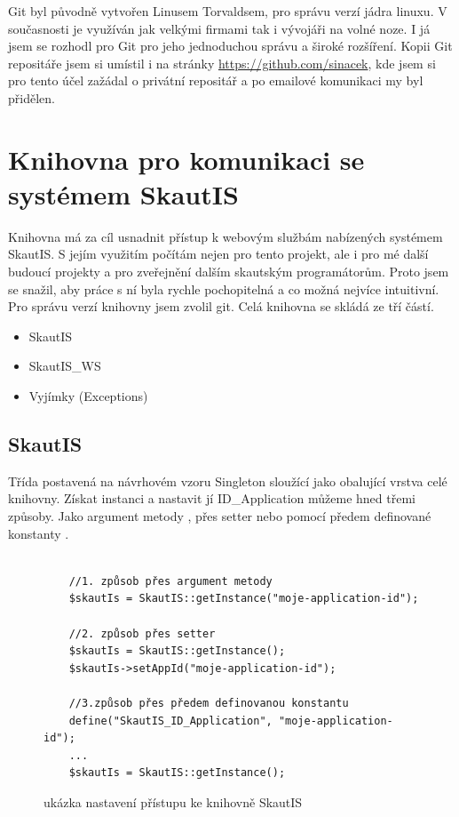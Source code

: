 \documentclass[thesis=B,czech]{FITthesis}[2011/06/14]
\begin{document}
Git byl původně vytvořen Linusem Torvaldsem, pro správu verzí jádra linuxu. V současnosti je využíván jak velkými firmami tak i vývojáři na volné noze. I já jsem se rozhodl pro Git pro jeho jednoduchou správu a široké rozšíření. Kopii Git repositáře jsem si umístil i na stránky \url{https://github.com/sinacek}, kde jsem si pro tento účel zažádal o privátní repositář a po emailové komunikaci my byl přidělen.

\section{Knihovna pro komunikaci se systémem SkautIS}
Knihovna má za cíl usnadnit přístup k webovým službám nabízených systémem SkautIS. S jejím využitím počítám nejen pro tento projekt, ale i pro mé další budoucí projekty a pro zveřejnění dalším skautským programátorům. Proto jsem se snažil, aby práce s ní byla rychle pochopitelná a co možná nejvíce intuitivní. Pro správu verzí knihovny jsem zvolil git.
Celá knihovna se skládá ze tří částí.
\begin{itemize}
	\item SkautIS
	\item SkautIS\_WS
	\item Vyjímky (Exceptions)
\end{itemize}

\subsection{SkautIS}
Třída postavená na návrhovém vzoru Singleton sloužící jako obalující vrstva celé knihovny. Získat instanci a nastavit jí ID\_Application můžeme hned třemi způsoby. Jako argument metody , přes setter  nebo pomocí předem definované konstanty .

\begin{figure}[h]\centering
	\begin{verbatim}

	//1. způsob přes argument metody
	$skautIs = SkautIS::getInstance("moje-application-id");

	//2. způsob přes setter
	$skautIs = SkautIS::getInstance();
	$skautIs->setAppId("moje-application-id"); 
	
	//3.způsob přes předem definovanou konstantu
	define("SkautIS_ID_Application", "moje-application-id"); 
	...
	$skautIs = SkautIS::getInstance(); 
	\end{verbatim}
	\caption{ukázka nastavení přístupu ke knihovně SkautIS}
\end{figure}
\end{document}
